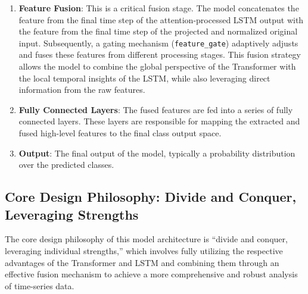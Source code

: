 \begin{enumerate}
    \item \textbf{Feature Fusion}: This is a critical fusion stage. The model concatenates the feature from the final time step of the attention-processed LSTM output with the feature from the final time step of the projected and normalized original input. Subsequently, a gating mechanism (\texttt{feature\_gate}) adaptively adjusts and fuses these features from different processing stages. This fusion strategy allows the model to combine the global perspective of the Transformer with the local temporal insights of the LSTM, while also leveraging direct information from the raw features.
    \item \textbf{Fully Connected Layers}: The fused features are fed into a series of fully connected layers. These layers are responsible for mapping the extracted and fused high-level features to the final class output space.
    \item \textbf{Output}: The final output of the model, typically a probability distribution over the predicted classes.
\end{enumerate}

\subsection{Core Design Philosophy: Divide and Conquer, Leveraging Strengths}

The core design philosophy of this model architecture is ``divide and conquer, leveraging individual strengths,'' which involves fully utilizing the respective advantages of the Transformer and LSTM and combining them through an effective fusion mechanism to achieve a more comprehensive and robust analysis of time-series data.

